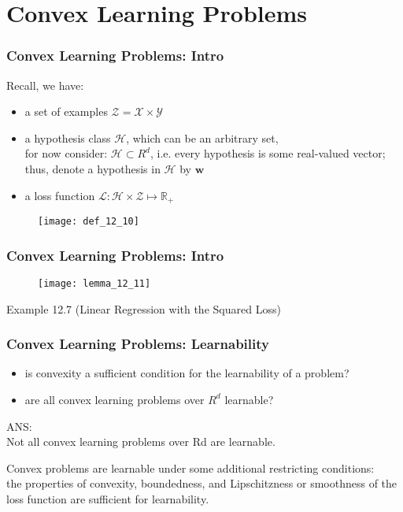 \section{Convex Learning Problems}


\begin{frame}
\frametitle{Convex Learning Problems: Intro}

Recall, we have:
\begin{itemize}
    \item a set of examples $\mathcal{Z} = \mathcal{X} \times \mathcal{Y}$
    \item a hypothesis class $\mathcal{H}$, which can be an arbitrary set,\\
    for now consider: $ \mathcal{H} \subset R^d$, i.e.
    every hypothesis is some real-valued vector;
    thus, denote a hypothesis in $\mathcal{H}$ by $\mathbf{w}$
    \item a loss function $\mathcal{L}: \mathcal{H} \times \mathcal{Z} \mapsto \mathbb{R_{+}}$
\end{itemize}

\begin{figure}
    \centering
    \texttt{[image: def\_12\_10]}
\end{figure}

\end{frame}

\begin{frame}
\frametitle{Convex Learning Problems: Intro}

\begin{figure}
    \centering
    \texttt{[image: lemma\_12\_11]}
\end{figure}

Example 12.7 (Linear Regression with the Squared Loss)

\end{frame}

\begin{frame}
\frametitle{Convex Learning Problems: Learnability}
\begin{itemize}
    \item is convexity a sufficient condition for the learnability of a problem?
    \item are all convex learning problems over $R^d$ learnable?
\end{itemize}

ANS:\\
Not all convex learning problems over Rd are learnable.

Convex problems are learnable under some additional restricting conditions:\\
the properties of convexity, boundedness, and Lipschitzness or smoothness of the
loss function are sufficient for learnability.

\end{frame}

